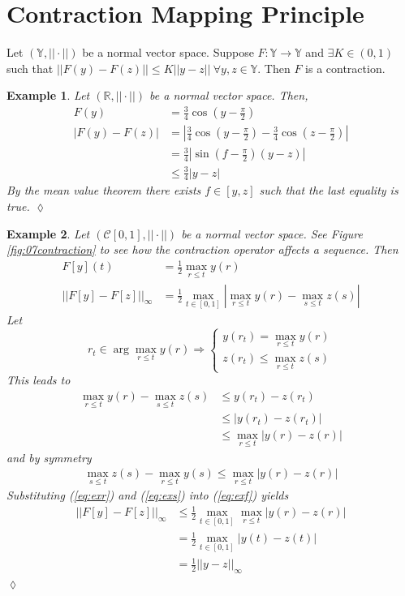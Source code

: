 \documentclass[lecture,12pt,]{pcms-l}
\theoremstyle{example}
\newtheorem{example}{Example}[section]
\newcommand{\vsp}{(\mathbb{Y},||\cdot||)}
\begin{document}
\section{Contraction Mapping Principle}
\begin{definition}
Let $\vsp$ be a normal vector space. Suppose $F:\mathbb{Y}\to\mathbb{Y}$ and $\exists K\in(0,1)$ such that $||F(y)-F(z)||\leq K||y-z|| ~\forall y,z\in\mathbb{Y}$. Then $F$ is a contraction.
\end{definition}

\begin{example}
Let $(\mathbb{R},||\cdot||)$ be a normal vector space. Then,
\begin{align*}
F(y) &= \frac{3}{4}\cos(y-\frac{\pi}{2}) \\
|F(y)-F(z)| &= \left|\frac{3}{4}\cos(y-\frac{\pi}{2})-\frac{3}{4}\cos(z-\frac{\pi}{2})\right| \\
&= \frac{3}{4}\left|\sin(f-\frac{\pi}{2})(y-z)\right| \\
&\leq \frac{3}{4}|y-z|
\end{align*}
By the mean value theorem there exists $f\in[y,z]$ such that the last equality is true.
$\lozenge$
\end{example}

\begin{example}
Let $(\mathcal{C}[0,1],||\cdot||)$ be a normal vector space. See Figure \ref{fig:07contraction} to see how the contraction operator affects a sequence. Then
\begin{align}
\label{eq:exf}
F[y](t) &= \frac{1}{2}\max_{r\leq t}y(r) \nonumber \\
||F[y]-F[z]||_\infty &= \frac{1}{2}\max_{t\in[0,1]}|\max_{r\leq t}y(r)-\max_{s\leq t}z(s)|
\end{align}
Let
$$r_t\in\arg\max_{r\leq t}y(r) \Rightarrow \begin{cases} y(r_t) = \max_{r\leq t}y(r) \\ z(r_t)\leq\max_{r\leq t}z(s) \end{cases}$$
This leads to
\begin{align}
\label{eq:exr}
\max_{r\leq t}y(r)-\max_{s\leq t}z(s) &\leq y(r_t)-z(r_t) \nonumber \\
&\leq |y(r_t)-z(r_t)| \nonumber \\
&\leq \max_{r\leq t}|y(r)-z(r)|
\end{align}
and by symmetry
\begin{align}
\label{eq:exs}
\max_{s\leq t}z(s)-\max_{r\leq t}y(s) \leq \max_{r\leq t}|y(r)-z(r)|
\end{align}
Substituting (\ref{eq:exr}) and (\ref{eq:exs}) into (\ref{eq:exf}) yields
\begin{align*}
||F[y]-F[z]||_\infty &\leq \frac{1}{2}\max_{t\in[0,1]}\max_{r\leq t}|y(r)-z(r)| \\
&= \frac{1}{2}\max_{t\in[0,1]}|y(t)-z(t)| \\
&= \frac{1}{2}||y-z||_\infty
\end{align*}
$\lozenge$
\end{example}
\end{document}
